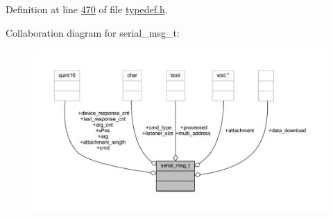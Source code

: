Definition at line \hyperlink{a00001_source_l00470}{470} of file \hyperlink{a00001_source}{typedef.\+h}.



Collaboration diagram for serial\+\_\+msg\+\_\+t\+:
\nopagebreak
\begin{figure}[H]
\begin{center}
\leavevmode
\includegraphics[width=350pt]{d0/d1f/a00247}
\end{center}
\end{figure}
